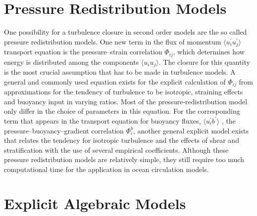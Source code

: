 \section{Pressure Redistribution Models}\label{pressresm}

One possibility for a turbulence closure in second order models are the so 
called pressure redistribution models. One new term in the flux of momentum 
$\langle u_i^\prime u_j^\prime \rangle$ transport equation is the 
pressure--strain correlation $\Phi_{ij}$, which determines how energy is 
distributed among the components $\langle u_i u_j \rangle$. The closure for 
this quantity is the most crucial assumption that has to be made in turbulence 
models. A general and commonly used equation exists for the explicit 
calculation of $\Phi_{ij}$ from approximations 
for the tendency of turbulence to be isotropic, straining effects and buoyancy 
input in varying ratios. Most of the pressure-redistribution model only 
differ in the choice of parameters in this equation. For the corresponding term 
that appears in the 
transport equation for buoyancy fluxes, $\langle u_i^\prime b^\prime \rangle$ , 
the pressure--buoyancy--gradient correlation $\Phi_i^b$, another 
general explicit model exists that relates the tendency for isotropic 
turbulence and the effects of shear and stratification with the use of several 
empirical coefficients. Although these pressure redistribution models are 
relatively simple, they still require too much computational time for the 
application in ocean circulation models. 

\section{Explicit Algebraic Models}

